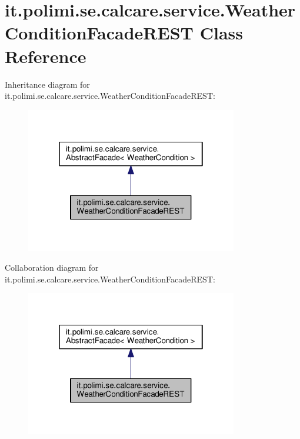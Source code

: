 \hypertarget{classit_1_1polimi_1_1se_1_1calcare_1_1service_1_1WeatherConditionFacadeREST}{}\section{it.\+polimi.\+se.\+calcare.\+service.\+Weather\+Condition\+Facade\+R\+E\+S\+T Class Reference}
\label{classit_1_1polimi_1_1se_1_1calcare_1_1service_1_1WeatherConditionFacadeREST}


Inheritance diagram for it.\+polimi.\+se.\+calcare.\+service.\+Weather\+Condition\+Facade\+R\+E\+S\+T\+:
\nopagebreak
\begin{figure}[H]
\begin{center}
\leavevmode
\includegraphics[width=262pt]{classit_1_1polimi_1_1se_1_1calcare_1_1service_1_1WeatherConditionFacadeREST__inherit__graph}
\end{center}
\end{figure}


Collaboration diagram for it.\+polimi.\+se.\+calcare.\+service.\+Weather\+Condition\+Facade\+R\+E\+S\+T\+:
\nopagebreak
\begin{figure}[H]
\begin{center}
\leavevmode
\includegraphics[width=262pt]{classit_1_1polimi_1_1se_1_1calcare_1_1service_1_1WeatherConditionFacadeREST__coll__graph}
\end{center}
\end{figure}

